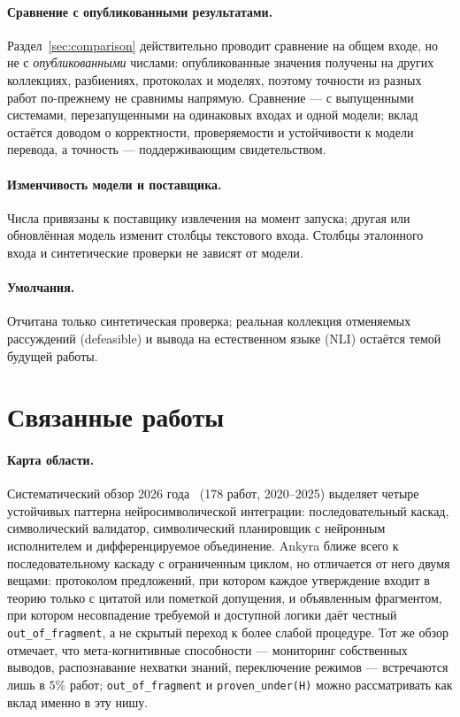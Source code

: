 \documentclass[11pt,a4paper]{article}
\begin{document}
\paragraph{Сравнение с опубликованными результатами.} Раздел~\ref{sec:comparison} действительно проводит сравнение
на общем входе, но не с \emph{опубликованными} числами: опубликованные значения получены на других коллекциях,
разбиениях, протоколах и моделях, поэтому точности из разных работ по-прежнему не сравнимы напрямую. Сравнение —
с выпущенными системами, перезапущенными на одинаковых входах и одной модели; вклад остаётся доводом о корректности,
проверяемости и устойчивости к модели перевода, а точность — поддерживающим свидетельством.

\paragraph{Изменчивость модели и поставщика.} Числа привязаны к поставщику извлечения на момент запуска; другая
или обновлённая модель изменит столбцы текстового входа. Столбцы эталонного входа и синтетические проверки не
зависят от модели.

\paragraph{Умолчания.} Отчитана только синтетическая проверка; реальная коллекция отменяемых рассуждений
(defeasible) и вывода на естественном языке (NLI) остаётся темой будущей работы.

\section{Связанные работы}
\label{sec:related}

\paragraph{Карта области.} Систематический обзор 2026 года~\cite{survey2026} (178 работ, 2020--2025) выделяет четыре
устойчивых паттерна нейросимволической интеграции: последовательный каскад, символический валидатор, символический
планировщик с нейронным исполнителем и дифференцируемое объединение. Ankyra ближе всего к последовательному каскаду
с ограниченным циклом, но отличается от него двумя вещами: протоколом предложений, при котором каждое утверждение
входит в теорию только с цитатой или пометкой допущения, и объявленным фрагментом, при котором несовпадение требуемой
и доступной логики даёт честный \texttt{out\_of\_fragment}, а не скрытый переход к более слабой процедуре. Тот же
обзор отмечает, что мета-когнитивные способности — мониторинг собственных выводов, распознавание нехватки знаний,
переключение режимов — встречаются лишь в $5\%$ работ; \texttt{out\_of\_fragment} и \texttt{proven\_under(H)}
можно рассматривать как вклад именно в эту нишу.
\end{document}
